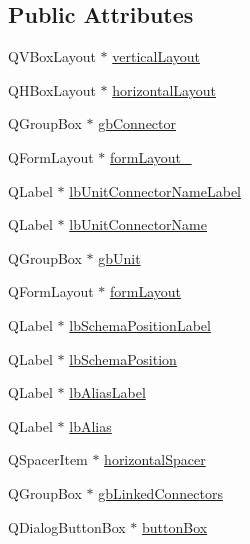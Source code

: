 \subsection*{Public Attributes}
\begin{DoxyCompactItemize}
\item 
Q\-V\-Box\-Layout $\ast$ \hyperlink{class_ui__mdt_cl_linked_unit_connector_info_dialog_abf60c0cfcc1c4f0f55f2153043f7f9b8}{vertical\-Layout}
\item 
Q\-H\-Box\-Layout $\ast$ \hyperlink{class_ui__mdt_cl_linked_unit_connector_info_dialog_a27b7df6f0a3e1bf4f7471ecd1264bc50}{horizontal\-Layout}
\item 
Q\-Group\-Box $\ast$ \hyperlink{class_ui__mdt_cl_linked_unit_connector_info_dialog_a58abb95c7f61995cefd76386eeb4b43d}{gb\-Connector}
\item 
Q\-Form\-Layout $\ast$ \hyperlink{class_ui__mdt_cl_linked_unit_connector_info_dialog_a5d257c90710ebdc8ede8cab3748108ef}{form\-Layout\-\_}
\item 
Q\-Label $\ast$ \hyperlink{class_ui__mdt_cl_linked_unit_connector_info_dialog_a1a21797a3a2f53a2d1f139c2226da09f}{lb\-Unit\-Connector\-Name\-Label}
\item 
Q\-Label $\ast$ \hyperlink{class_ui__mdt_cl_linked_unit_connector_info_dialog_a726b2a56d25405b1c4562053c7b60d4f}{lb\-Unit\-Connector\-Name}
\item 
Q\-Group\-Box $\ast$ \hyperlink{class_ui__mdt_cl_linked_unit_connector_info_dialog_af1240c366303e07931f1cb607c486be6}{gb\-Unit}
\item 
Q\-Form\-Layout $\ast$ \hyperlink{class_ui__mdt_cl_linked_unit_connector_info_dialog_a1d131b2dd7ee7aced11b174aee1735be}{form\-Layout}
\item 
Q\-Label $\ast$ \hyperlink{class_ui__mdt_cl_linked_unit_connector_info_dialog_aba9ea2741682576187856511f769886a}{lb\-Schema\-Position\-Label}
\item 
Q\-Label $\ast$ \hyperlink{class_ui__mdt_cl_linked_unit_connector_info_dialog_a56f38137f46f1ceb4d578fa7cfc57046}{lb\-Schema\-Position}
\item 
Q\-Label $\ast$ \hyperlink{class_ui__mdt_cl_linked_unit_connector_info_dialog_a99e6d3836dedd8dda30fc45f448f7071}{lb\-Alias\-Label}
\item 
Q\-Label $\ast$ \hyperlink{class_ui__mdt_cl_linked_unit_connector_info_dialog_a1a801d935c2798f307fa61155cf90266}{lb\-Alias}
\item 
Q\-Spacer\-Item $\ast$ \hyperlink{class_ui__mdt_cl_linked_unit_connector_info_dialog_aaaa925ff91f3f54fcfb3fd54a1d1b90c}{horizontal\-Spacer}
\item 
Q\-Group\-Box $\ast$ \hyperlink{class_ui__mdt_cl_linked_unit_connector_info_dialog_a8274bed7b1d6fbfa75c426615f03d0a3}{gb\-Linked\-Connectors}
\item 
Q\-Dialog\-Button\-Box $\ast$ \hyperlink{class_ui__mdt_cl_linked_unit_connector_info_dialog_a2c38ee701306f0ba21aff3144bd9c5fb}{button\-Box}
\end{DoxyCompactItemize}


